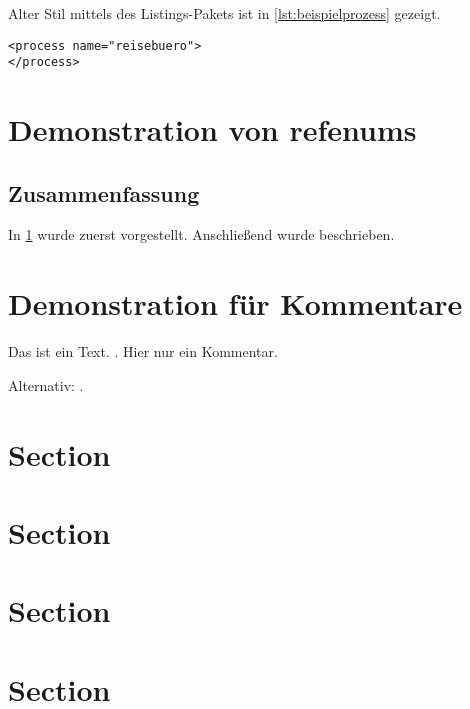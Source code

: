 Alter Stil mittels des Listings-Pakets ist in \cref{lst:beispielprozess} gezeigt.
\begin{lstlisting}[float,caption={Beispielprozess},label={lst:beispielprozess}]
<process name="reisebuero">
</process>
\end{lstlisting}

\section{Demonstration von refenums}
\label{sec:method}

\label{sec:rqa}
\blindtext

\blindtext

\subsection{Zusammenfassung}
In \cref{sec:method} wurde zuerst  vorgestellt.
Anschließend wurde  beschrieben.

\section{Demonstration für Kommentare}
Das ist ein Text.
.
Hier nur ein Kommentar.

Alternativ: .


\section{Section}

\section{Section}

\section{Section}

\section{Section}

